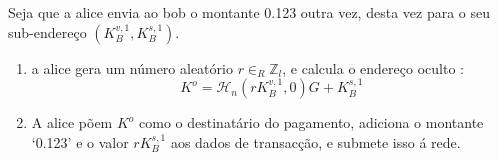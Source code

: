 Seja que a alice envia ao bob o montante 0.123 outra vez, desta vez para o seu sub-endereço $(K_B^{v,1}, K_B^{s,1})$. 
\begin{enumerate}
	\item a alice gera um número aleatório $r \in_R \mathbb{Z}_l$, e calcula o endereço oculto :
    \vspace{.175cm}
	\[ K^o  = \mathcal{H}_n(r K_B^{v,1},0)G + K_B^{s,1} \]

	\item A alice põem $K^o$ como o destinatário do pagamento, adiciona o montante `0.123' e o valor $r K_B^{s,1}$ aos dados de transacção, e submete isso á rede. 
	

\end{enumerate}
